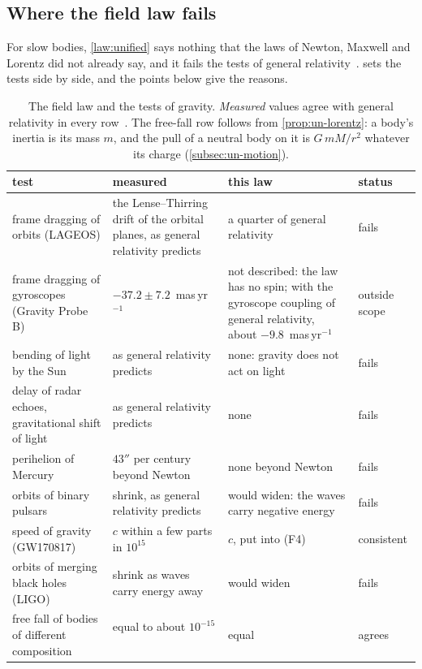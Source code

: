 \subsection{Where the field law fails}\label{subsec:un-limits}

For slow bodies, \cref{law:unified} says nothing that the laws of Newton, Maxwell and Lorentz did not already say, and it fails the tests of general relativity~\citep{Will2014}.  sets the tests side by side, and the points below give the reasons.

\begin{table}[t]
\caption{The field law and the tests of gravity. \emph{Measured} values agree with general relativity in every row~\citep{Will2014}. The free-fall row follows from \cref{prop:un-lorentz}: a body's inertia is its mass $m$, and the pull of a neutral body on it is $G\,mM/r^2$ whatever its charge (\cref{subsec:un-motion}).}
\label{tab:gravity-tests}
\small
\begin{tabularx}{\textwidth}{@{}>{\raggedright\arraybackslash}p{} >{\raggedright\arraybackslash}X >{\raggedright\arraybackslash}p{} l@{}}
\toprule
test & measured & this law & status \\
\midrule
frame dragging of orbits (LAGEOS) & the Lense--Thirring drift of the orbital planes, as general relativity predicts~\citep{Ciufolini2004} & a quarter of general relativity & fails \\
frame dragging of gyroscopes (Gravity Probe B) & $-37.2 \pm 7.2$~mas\,yr$^{-1}$~\citep{Everitt2011} & not described: the law has no spin; with the gyroscope coupling of general relativity, about $-9.8$~mas\,yr$^{-1}$ & outside scope \\
bending of light by the Sun & as general relativity predicts & none: gravity does not act on light & fails \\
delay of radar echoes, gravitational shift of light & as general relativity predicts & none & fails \\
perihelion of Mercury & $43''$ per century beyond Newton & none beyond Newton & fails \\
orbits of binary pulsars & shrink, as general relativity predicts~\citep{WeisbergHuang2016} & would widen: the waves carry negative energy & fails \\
speed of gravity (GW170817) & $c$ within a few parts in $10^{15}$~\citep{Abbott2017GRB} & $c$, put into (F4) & consistent \\
orbits of merging black holes (LIGO) & shrink as waves carry energy away~\citep{Abbott2016} & would widen & fails \\
free fall of bodies of different composition & equal to about $10^{-15}$~\citep{Touboul2022} & equal & agrees \\
\bottomrule
\end{tabularx}
\end{table}
